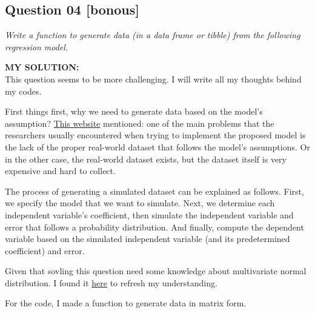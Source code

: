 \documentclass[
]{article}
\begin{document}
\hypertarget{question-04-bonous}{%
\subsection{Question 04 {[}bonous{]}}\label{question-04-bonous}}

\emph{Write a function to generate data (in a data frame or tibble) from
the following regression model.}

\textbf{MY SOLUTION:}\\
This question seems to be more challenging. I will write all my thoughts
behind my codes.

First things first, why we need to generate data based on the model's
assumption?
\href{https://towardsdatascience.com/generate-simulated-dataset-for-linear-model-in-r-469a5e2f4c2e}{This
website} mentioned: one of the main problems that the researchers
usually encountered when trying to implement the proposed model is the
lack of the proper real-world dataset that follows the model's
assumptions. Or in the other case, the real-world dataset exists, but
the dataset itself is very expensive and hard to collect.

The process of generating a simulated dataset can be explained as
follows. First, we specify the model that we want to simulate. Next, we
determine each independent variable's coefficient, then simulate the
independent variable and error that follows a probability distribution.
And finally, compute the dependent variable based on the simulated
independent variable (and its predetermined coefficient) and error.

Given that sovling this question need some knowledge about multivariate
normal distribution. I found it
\href{https://brilliant.org/wiki/multivariate-normal-distribution/?irclickid=zrX11zzxmxyNWr-WSkQQ6zQ1UkA1E6R2s2F1Uw0\&utm_medium=affiliates\&utm_campaign=1310690\&utm_source=\&utm_content=1674588816059_TEXT_LINK_20\%25\%20Off\%20Annual\%20Subscription\%20\&utm_term=middle\&irgwc=1}{here}
to refresh my understanding.

For the code, I made a function to generate data in matrix form.
\end{document}
